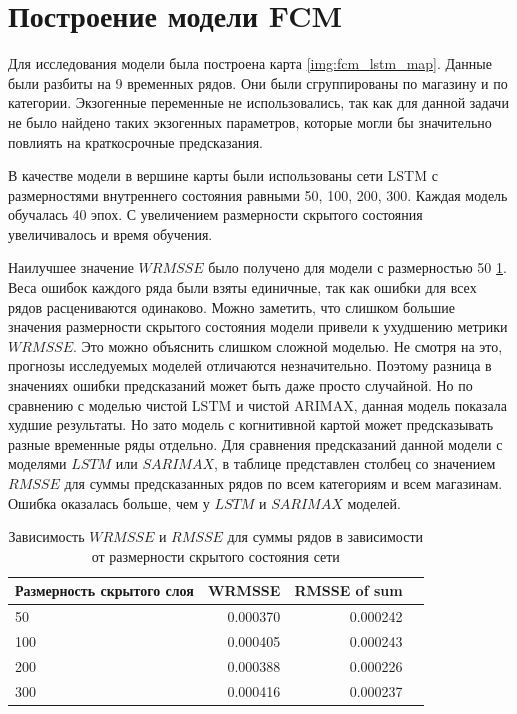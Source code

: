 \section{Построение модели FCM}

Для исследования модели была построена карта \ref{img:fcm_lstm_map}.
Данные были разбиты на 9 временных рядов. Они были сгруппированы по
магазину и по категории. Экзогенные переменные не использовались,
так как для данной задачи не было найдено таких экзогенных параметров,
которые могли бы значительно повлиять на краткосрочные предсказания.

В качестве модели в вершине карты были использованы сети LSTM с размерностями
внутреннего состояния равными 50, 100, 200, 300. Каждая модель обучалась 40 эпох.
С увеличением размерности скрытого состояния увеличивалось и время обучения.

Наилучшее значение $ WRMSSE $ было получено для модели с размерностью 50 \ref{tbl:rmsse_fcm_lstm}.
Веса ошибок каждого ряда были взяты единичные, так как ошибки для всех рядов расцениваются одинаково.
Можно заметить, что слишком большие значения размерности скрытого состояния модели
привели к ухудшению метрики $ WRMSSE $. Это можно объяснить слишком сложной моделью.
Не смотря на это, прогнозы исследуемых моделей отличаются незначительно.
Поэтому разница в значениях ошибки предсказаний может быть даже просто случайной.
Но по сравнению с моделью чистой LSTM и чистой ARIMAX, данная модель показала худшие результаты.
Но зато модель с когнитивной картой может предсказывать разные временные ряды отдельно.
Для сравнения предсказаний данной модели с моделями $ LSTM $ или $ SARIMAX $, в
таблице представлен столбец со значением $ RMSSE $ для суммы предсказанных рядов
по всем категориям и всем магазинам. Ошибка оказалась больше, чем у  $ LSTM $ и $ SARIMAX $
моделей.

\begin{table}
    \caption{Зависимость $ WRMSSE $ и $ RMSSE $ для суммы рядов в зависимости от размерности скрытого состояния сети }
    \centering
    \begin{tabular}{|l|r||r|r|}
        \hline
            Размерность скрытого слоя &   WRMSSE & RMSSE of sum \\
        \hline
            50                         & 0.000370 & 0.000242 \\
            100                        & 0.000405 & 0.000243 \\
            200                        & 0.000388 & 0.000226 \\
            300                        & 0.000416 & 0.000237 \\
        \hline
    \end{tabular}
    \label{tbl:rmsse_fcm_lstm}
\end{table}


